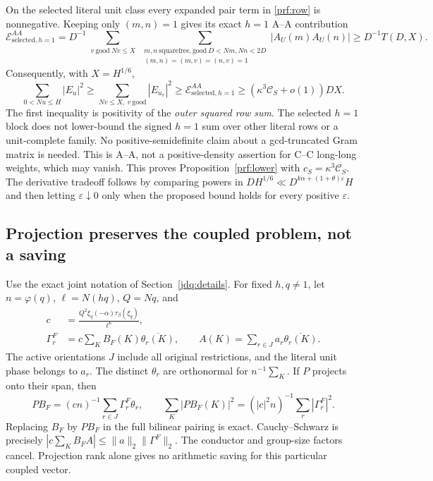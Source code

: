 On the selected literal unit class every expanded pair term in
\eqref{prf:row} is nonnegative. Keeping only $(m,n)=1$ gives its exact
$h=1$ A--A contribution
\[
 \mathcal E^{AA}_{\mathrm{selected},h=1}
 =D^{-1}\sum_{\substack{v\ \mathrm{good}\ Nv\le X}}
  \sum_{\substack{m,n\ \mathrm{squarefree,good}\ D<Nm,Nn<2D\\
                   (m,n)=(m,v)=(n,v)=1}}|A_U(m)A_U(n)|
 \ge D^{-1}T(D,X).
\]
Consequently, with $X=H^{1/6}$,
\[
 \sum_{0<Nu\le H}|E_u|^2
 \ge\sum_{Nv\le X,\ v\ \mathrm{good}}|E_{u_v}|^2
 \ge\mathcal E^{AA}_{\mathrm{selected},h=1}
 \ge(\kappa^3\mathscr C_S+o(1))DX.
\]
The first inequality is positivity of the \emph{outer squared row sum}.
The selected $h=1$ block does not lower-bound the signed $h=1$ sum over
other literal rows or a unit-complete family. No positive-semidefinite
claim about a gcd-truncated Gram matrix is needed. This is A--A, not a
positive-density assertion for C--C long-long weights, which may vanish.
This proves Proposition~\ref{prf:lower} with $c_S=\kappa^3\mathscr C_S$.
The derivative tradeoff follows by comparing powers in
$DH^{1/6}\ll D^{k\alpha+(1+\theta)\varepsilon}H$ and then letting
$\varepsilon\downarrow0$ only when the proposed bound holds for every
positive $\varepsilon$.

\subsection{Projection preserves the coupled problem, not a saving}
Use the exact joint notation of Section~\ref{jdq:details}. For fixed
$h,q\ne1$, let $n=\varphi(q)$, $\ell=N(hq)$, $Q=Nq$, and
\begin{align*}
 c&=\frac{Q^2\xi_q(-\alpha)\tau_\beta(\xi_q)}{\ell^6},\\
 \Gamma_r^F&=c\sum_K B_F(K)\overline{\theta_r(K)},\qquad
 A(K)=\sum_{r\in J}a_r\overline{\theta_r(K)}.
\end{align*}
The active orientations $J$ include all original restrictions, and the
literal unit phase belongs to $a_r$. The distinct $\theta_r$ are
orthonormal for $n^{-1}\sum_K$. If $P$ projects onto their span, then
\[
 PB_F=(cn)^{-1}\sum_{r\in J}\Gamma_r^F\theta_r,\qquad
 \sum_K|PB_F(K)|^2=(|c|^2n)^{-1}\sum_r|\Gamma_r^F|^2.
\]
Replacing $B_F$ by $PB_F$ in the full bilinear pairing is exact.
Cauchy--Schwarz is precisely
$|c\sum_KB_FA|\le\|a\|_2\|\Gamma^F\|_2$.
The conductor and group-size factors cancel. Projection rank alone gives
no arithmetic saving for this particular coupled vector.

